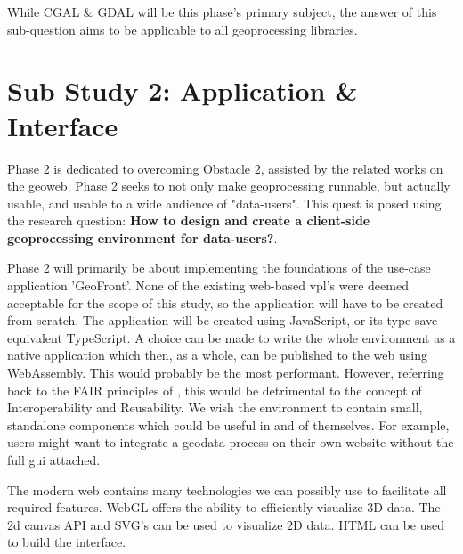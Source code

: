 While CGAL \& GDAL will be this phase's primary subject, the answer of this sub-question aims to be applicable to all geoprocessing libraries. 


\section{Sub Study 2: Application \& Interface}
\label{sec:method-two}

\mySubRQTwo


Phase 2 is dedicated to overcoming Obstacle 2, assisted by the related works on the geoweb. Phase 2 seeks to not only make geoprocessing runnable, but actually usable, and usable to a wide audience of "data-users". This quest is posed using the research question: \textbf{How to design and create a client-side geoprocessing environment for data-users?}. 

Phase 2 will primarily be about implementing the foundations of the use-case application 'GeoFront'. None of the existing web-based \ac{vpl}'s were deemed acceptable for the scope of this study, so the application will have to be created from scratch. 
The application will be created using JavaScript, or its type-save equivalent TypeScript. 
A choice can be made to write the whole environment as a native application which then, as a whole, can be published to the web using WebAssembly. 
This would probably be the most performant. 
However, referring back to the FAIR principles of \cite{mark_d_wilkinson_fair_2016}, this would be detrimental to the concept of Interoperability and Reusability. 
We wish the environment to contain small, standalone components which could be useful in and of themselves. 
For example, users might want to integrate a geodata process on their own website without the full \ac{gui} attached.

The modern web contains many technologies we can possibly use to facilitate all required features. WebGL offers the ability to efficiently visualize 3D data. The 2d canvas API and SVG's can be used to visualize 2D data. HTML can be used to build the interface.

